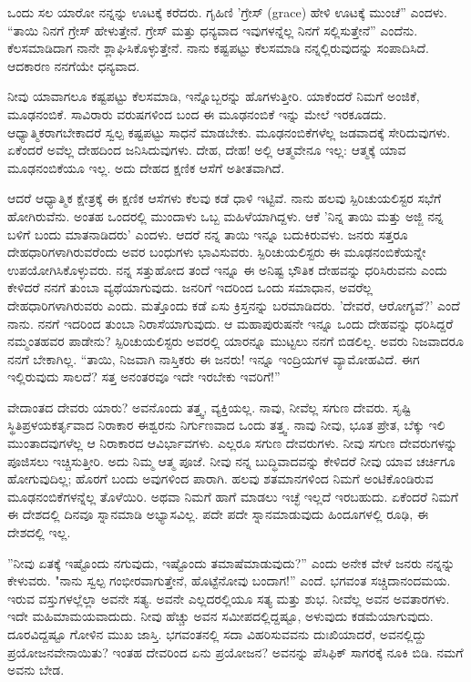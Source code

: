 ಒಂದು ಸಲ ಯಾರೋ ನನ್ನನ್ನು ಊಟಕ್ಕೆ ಕರೆದರು. ಗೃಹಿಣಿ 'ಗ್ರೇಸ್ (grace) ಹೇಳಿ ಊಟಕ್ಕೆ ಮುಂಚೆ” ಎಂದಳು. “ತಾಯಿ ನಿನಗೆ ಗ್ರೇಸ್ ಹೇಳುತ್ತೇನೆ. ಗ್ರೇಸ್ ಮತ್ತು ಧನ್ಯವಾದ ಇವುಗಳನ್ನೆಲ್ಲ ನಿನಗೆ ಸಲ್ಲಿಸುತ್ತೇನೆ'' ಎಂದೆನು. ಕೆಲಸಮಾಡಿದಾಗ ನಾನೇ ಶ್ಲಾಘಿಸಿಕೊಳ್ಳುತ್ತೇನೆ. ನಾನು ಕಷ್ಟಪಟ್ಟು ಕೆಲಸಮಾಡಿ ನನ್ನಲ್ಲಿರುವುದನ್ನು ಸಂಪಾದಿಸಿದೆ. ಆದಕಾರಣ ನನಗೆಯೇ ಧನ್ಯವಾದ.

ನೀವು ಯಾವಾಗಲೂ ಕಷ್ಟಪಟ್ಟು ಕೆಲಸಮಾಡಿ, ಇನ್ನೊಬ್ಬರನ್ನು ಹೊಗಳುತ್ತೀರಿ. ಯಾಕೆಂದರೆ ನಿಮಗೆ ಅಂಜಿಕೆ, ಮೂಢನಂಬಿಕೆ. ಸಾವಿರಾರು ವರುಷಗಳಿಂದ ಬಂದ ಈ ಮೂಢನಂಬಿಕೆ ಇನ್ನು ಮೇಲೆ ಇರಕೂಡದು. ಆಧ್ಯಾತ್ಮಿಕರಾಗಬೇಕಾದರೆ ಸ್ವಲ್ಪ ಕಷ್ಟಪಟ್ಟು ಸಾಧನೆ ಮಾಡಬೇಕು. ಮೂಢನಂಬಿಕೆಗಳೆಲ್ಲ ಜಡವಾದಕ್ಕೆ ಸೇರಿದುವುಗಳು. ಏಕೆಂದರೆ ಅವೆಲ್ಲ ದೇಹದಿಂದ ಜನಿಸಿದುವುಗಳು. ದೇಹ, ದೇಹ! ಅಲ್ಲಿ ಆತ್ಮವೇನೂ ಇಲ್ಲ: ಆತ್ಮಕ್ಕೆ ಯಾವ ಮೂಢನಂಬಿಕೆಯೂ ಇಲ್ಲ. ಅದು ದೇಹದ ಕ್ಷಣಿಕ ಆಸೆಗೆ ಅತೀತವಾಗಿದೆ.

ಆದರೆ ಆಧ್ಯಾತ್ಮಿಕ ಕ್ಷೇತ್ರಕ್ಕೆ ಈ ಕ್ಷಣಿಕ ಆಸೆಗಳು ಕೆಲವು ಕಡೆ ಧಾಳಿ ಇಟ್ಟಿವೆ. ನಾನು ಹಲವು ಸ್ಪಿರಿಚುಯಲಿಸ್ಟರ ಸಭೆಗೆ ಹೋಗಿರುವೆನು. ಅಂತಹ ಒಂದರಲ್ಲಿ ಮುಂದಾಳು ಒಬ್ಬ ಮಹಿಳೆಯಾಗಿದ್ದಳು. ಆಕೆ 'ನಿನ್ನ ತಾಯಿ ಮತ್ತು ಅಜ್ಜಿ ನನ್ನ ಬಳಿಗೆ ಬಂದು ಮಾತನಾಡಿದರು' ಎಂದಳು. ಆದರೆ ನನ್ನ ತಾಯಿ ಇನ್ನೂ ಬದುಕಿರುವಳು. ಜನರು ಸತ್ತರೂ ದೇಹಧಾರಿಗಳಾಗಿರುವರೆಂದು ಅವರ ಬಂಧುಗಳು ಭಾವಿಸುವರು. ಸ್ಪಿರಿಚುಯಲಿಸ್ಟರು ಈ ಮೂಢನಂಬಿಕೆಯನ್ನೇ ಉಪಯೋಗಿಸಿಕೊಳ್ಳುವರು. ನನ್ನ ಸತ್ತುಹೋದ ತಂದೆ ಇನ್ನೂ ಈ ಅನಿಷ್ಟ ಭೌತಿಕ ದೇಹವನ್ನು ಧರಿಸಿರುವನು ಎಂದು ಕೇಳಿದರೆ ನನಗೆ ತುಂಬಾ ವ್ಯಥೆಯಾಗುವುದು. ಜನರಿಗೆ ಇದರಿಂದ ಒಂದು ಸಮಾಧಾನ, ಅವರೆಲ್ಲ ದೇಹಧಾರಿಗಳಾಗಿರುವರು ಎಂದು. ಮತ್ತೊಂದು ಕಡೆ ಏಸು ಕ್ರಿಸ್ತನನ್ನು ಬರಮಾಡಿದರು. 'ದೇವರೆ, ಆರೋಗ್ಯವೆ?' ಎಂದೆ ನಾನು. ನನಗೆ ಇದರಿಂದ ತುಂಬಾ ನಿರಾಸೆಯಾಗುವುದು. ಆ ಮಹಾಪುರುಷನೇ ಇನ್ನೂ ಒಂದು ದೇಹವನ್ನು ಧರಿಸಿದ್ದರೆ ನಮ್ಮಂತಹವರ ಪಾಡೇನು? ಸ್ಪಿರಿಚುಯಲಿಸ್ಟರು ಅವರಲ್ಲಿ ಯಾರನ್ನೂ ಮುಟ್ಟಲು ನನಗೆ ಬಿಡಲಿಲ್ಲ. ಅವರು ನಿಜವಾದರೂ ನನಗೆ ಬೇಕಾಗಿಲ್ಲ. “ತಾಯಿ, ನಿಜವಾಗಿ ನಾಸ್ತಿಕರು ಈ ಜನರು! ಇನ್ನೂ ಇಂದ್ರಿಯಗಳ ವ್ಯಾಮೋಹವಿದೆ. ಈಗ ಇಲ್ಲಿರುವುದು ಸಾಲದೆ? ಸತ್ತ ಅನಂತರವೂ ಇದೇ ಇರಬೇಕು ಇವರಿಗೆ!”

ವೇದಾಂತದ ದೇವರು ಯಾರು? ಅವನೊಂದು ತತ್ತ್ವ, ವ್ಯಕ್ತಿಯಲ್ಲ. ನಾವು, ನೀವೆಲ್ಲ ಸಗುಣ ದೇವರು. ಸೃಷ್ಟಿ ಸ್ಥಿತಿಪ್ರಳಯಕರ್ತೃವಾದ ನಿರಾಕಾರ ಈಶ್ವರನು ನಿರ್ಗುಣವಾದ ಒಂದು ತತ್ತ್ವ. ನಾವು ನೀವು, ಭೂತ ಪ್ರೇತ, ಬೆಕ್ಕು ಇಲಿ ಮುಂತಾದವುಗಳೆಲ್ಲ ಆ ನಿರಾಕಾರದ ಆವಿರ್ಭಾವಗಳು. ಎಲ್ಲರೂ ಸಗುಣ ದೇವರುಗಳು. ನೀವು ಸಗುಣ ದೇವರುಗಳನ್ನು ಪೂಜಿಸಲು ಇಚ್ಚಿಸುತ್ತೀರಿ. ಅದು ನಿಮ್ಮ ಆತ್ಮ ಪೂಜೆ. ನೀವು ನನ್ನ ಬುದ್ಧಿವಾದವನ್ನು ಕೇಳಿದರೆ ನೀವು ಯಾವ ಚರ್ಚಿಗೂ ಹೋಗುವುದಿಲ್ಲ; ಹೊರಗೆ ಬಂದು ಅವುಗಳಿಂದ ಪಾರಾಗಿ. ಹಲವು ಶತಮಾನಗಳಿಂದ ನಿಮಗೆ ಅಂಟಿಕೊಂಡಿರುವ ಮೂಢನಂಬಿಕೆಗಳನ್ನೆಲ್ಲ ತೊಳೆಯಿರಿ. ಅಥವಾ ನಿಮಗೆ ಹಾಗೆ ಮಾಡಲು ಇಚ್ಛೆ ಇಲ್ಲದೆ ಇರಬಹುದು. ಏಕೆಂದರೆ ನಿಮಗೆ ಈ ದೇಶದಲ್ಲಿ ದಿನವೂ ಸ್ನಾನಮಾಡಿ ಅಭ್ಯಾಸವಿಲ್ಲ. ಪದೇ ಪದೇ ಸ್ನಾನಮಾಡುವುದು ಹಿಂದೂಗಳಲ್ಲಿ ರೂಢಿ, ಈ ದೇಶದಲ್ಲಿ ಇಲ್ಲ.

''ನೀವು ಏತಕ್ಕೆ ಇಷ್ಟೊಂದು ನಗುವುದು, ಇಷ್ಟೊಂದು ತಮಾಷೆಮಾಡುವುದು?'' ಎಂದು ಅನೇಕ ವೇಳೆ ಜನರು ನನ್ನನ್ನು ಕೇಳುವರು. "ನಾನು ಸ್ವಲ್ಪ ಗಂಭೀರವಾಗುತ್ತೇನೆ, ಹೊಟ್ಟೆನೋವು ಬಂದಾಗ!” ಎಂದೆ. ಭಗವಂತ ಸಚ್ಚಿದಾನಂದಮಯ. ಇರುವ ವಸ್ತುಗಳಲ್ಲೆಲ್ಲಾ ಅವನೇ ಸತ್ಯ. ಅವನೇ ಎಲ್ಲದರಲ್ಲಿಯೂ ಸತ್ಯ ಮತ್ತು ಶುಭ. ನೀವೆಲ್ಲ ಅವನ ಅವತಾರಗಳು. ಇದೇ ಮಹಿಮಾಮಯವಾದುದು. ನೀವು ಹೆಚ್ಚು ಅವನ ಸಮೀಪದಲ್ಲಿದ್ದಷ್ಟೂ, ಅಳುವುದು ಕಡಮೆಯಾಗುವುದು. ದೂರವಿದ್ದಷ್ಟೂ ಗೋಳಿನ ಮುಖ ಜಾಸ್ತಿ. ಭಗವಂತನಲ್ಲಿ ಸದಾ ವಿಹರಿಸುವವನು ದುಃಖಿಯಾದರೆ, ಅವನಲ್ಲಿದ್ದು ಪ್ರಯೋಜನವೇನಾಯಿತು? ಇಂತಹ ದೇವರಿಂದ ಏನು ಪ್ರಯೋಜನ? ಅವನನ್ನು ಪೆಸಿಫಿಕ್ ಸಾಗರಕ್ಕೆ ನೂಕಿ ಬಿಡಿ. ನಮಗೆ ಅವನು ಬೇಡ.

